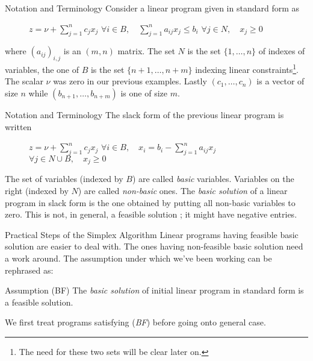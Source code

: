\documentclass[aspectratio = 169]{beamer}
\begin{document}
\begin{frame}{Notation and Terminology}
    Consider a linear program given in standard form as
    \begin{figure}
        \begin{linearProgG}{
            ${\displaystyle z = \nu + \sum_{j=1}^n c_jx_j}$
            }{
            ${\displaystyle \forall i \in B, \quad \sum_{j=1}^n a_{ij}x_j \leq b_i}$
            }{
            $\forall j \in N, \quad x_j \geq 0$
            }
        \end{linearProgG}
    \end{figure}
    where $(a_{ij})_{i, j}$ is an $(m, n)$ matrix. The set $N$ is the
    set $\{ 1, \ldots, n \}$ of indexes of variables, the one of $B$
    is the set $\{ n+1, \ldots, n+m \}$ indexing linear
    constraints\footnote{The need for these two sets will be clear
      later on.}.  The scalar $\nu$ was zero in our previous
    examples. Lastly $(c_1, \ldots, c_n)$ is a vector of size $n$
    while $(b_{n+1}, \ldots, b_{n+m})$ is one of size $m$.
\end{frame}

\begin{frame}{Notation and Terminology}
    The slack form of the previous linear program is written
    \begin{figure}
        \begin{linearProgG}{
            ${\displaystyle z = \nu + \sum_{j=1}^n c_jx_j}$
            }{
            ${\displaystyle \forall i \in B, \quad x_i = b_i - \sum_{j=1}^n a_{ij}x_j}$
            }{
            $\forall j \in N\cup B, \quad x_j \geq 0$
            }
        \end{linearProgG}
    \end{figure}
    The set of variables (indexed by $B$) are called \emph{basic}
    variables. Variables on the right (indexed by $N$) are called
    \emph{non-basic} ones. The \emph{basic solution} of a linear
    program in slack form is the one obtained by putting all non-basic
    variables to zero. This is not, in general, a feasible solution ;
    it might have negative entries.
\end{frame}

\begin{frame}{Practical Steps of the Simplex Algorithm}
  Linear programs having feasible basic solution are easier to deal
  with. The ones having non-feasible basic solution need a work
  around. The assumption under which we've been working can be
  rephrased as:
  \begin{alertblock}{Assumption (BF)}
    The \textit{basic solution} of initial linear program in
    standard form is a feasible solution.
  \end{alertblock}
  We first treat programs satisfying (\emph{BF}) before going onto
  general case.
\end{frame}
\end{document}
